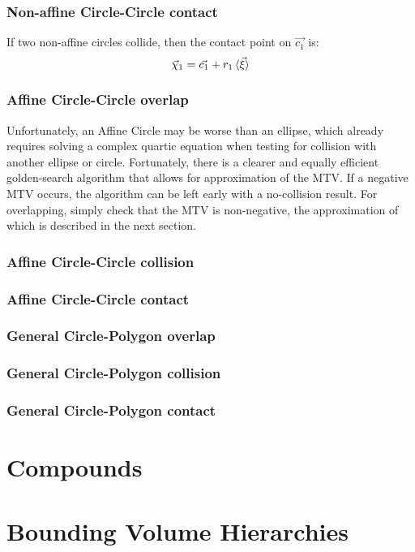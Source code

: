 \documentclass[10pt]{report}
\begin{document}
\subsubsection{Non-affine Circle-Circle contact}
If two non-affine circles collide, then the contact point on $\vec{c_1}$ is:
\begin{equation}\vec{\chi}_1=\vec{c_1}+r_1\braket{\vec{\xi}}\end{equation}

\subsubsection{Affine Circle-Circle overlap}
Unfortunately, an Affine Circle may be worse than an ellipse, which already requires solving a complex quartic equation when testing for collision with another ellipse or circle. Fortunately, there is a clearer and equally efficient golden-search algorithm that allows for approximation of the MTV. If a negative MTV occurs, the algorithm can be left early with a no-collision result. For overlapping, simply check that the MTV is non-negative, the approximation of which is described in the next section.

\subsubsection{Affine Circle-Circle collision}

\subsubsection{Affine Circle-Circle contact}

\subsubsection{General Circle-Polygon overlap}

\subsubsection{General Circle-Polygon collision}

\subsubsection{General Circle-Polygon contact}

\section{Compounds}

\section{Bounding Volume Hierarchies}
\end{document}
